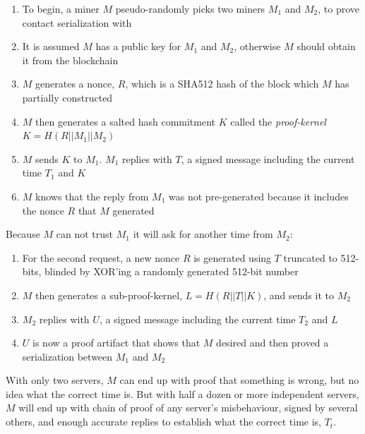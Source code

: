 \documentclass[UTF8, 10pt, nonatbib, nocopyrightspace, reprint]{sigplanconf}
\begin{document}
\begin{enumerate}
        \item To begin, a miner $M$ pseudo-randomly picks two miners $M_1$ and $M_2$, to prove contact serialization with
        \item It is assumed $M$ has a public key for $M_1$ and $M_2$, otherwise $M$ should obtain it from the blockchain
        \item $M$ generates a nonce, $R$, which is a SHA512 hash of the block which $M$ has partially constructed
        \item $M$ then generates a salted hash commitment $K$ called the \emph{proof-kernel} ${K = H\left(R || M_1 || M_2\right)}$
        \item $M$ sends $K$ to $M_1$. $M_1$ replies with $T$, a signed message including the current time $T_1$ and $K$
        \item $M$ knows that the reply from $M_1$ was not pre-generated because it includes the nonce $R$ that $M$ generated
\end{enumerate}

Because $M$ can not trust $M_1$ it will ask for another time from $M_2$:

\begin{enumerate}
        \item For the second request, a new nonce $R$ is generated using $T$ truncated to 512-bits, blinded by XOR'ing a randomly generated 512-bit number
        \item $M$ then generates a sub-proof-kernel, $L = H\left(R || T || K\right)$, and sends it to $M_2$
        \item $M_2$ replies with $U$, a signed message including the current time $T_2$ and $L$
        \item $U$ is now a proof artifact that shows that $M$ desired and then proved a serialization between $M_1$ and $M_2$
\end{enumerate}

With only two servers, $M$ can end up with proof that something is wrong, but no idea what the correct time is. But with half a dozen or more independent servers, $M$ will end up with chain of proof of any server's misbehaviour, signed by several others, and enough accurate replies to establish what the correct time is, $T_t$.
\end{document}
